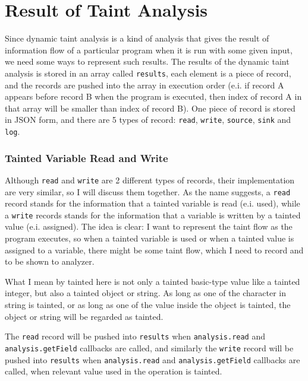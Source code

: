 \section{Result of Taint Analysis}

Since dynamic taint analysis is a kind of analysis that gives the result of information flow of a particular program when it is run with some given input, we need some ways to represent such results. The results of the dynamic taint analysis is stored in an array called \texttt{results}, each element is a piece of record, and the records are pushed into the array in execution order (e.i. if record A appears before record B when the program is executed, then index of record A in that array will be smaller than index of record B). One piece of record is stored in JSON form, and there are 5 types of record: \texttt{read}, \texttt{write}, \texttt{source}, \texttt{sink} and \texttt{log}.

\subsubsection{Tainted Variable Read and Write}

Although \texttt{read} and \texttt{write} are 2 different types of records, their implementation are very similar, so I will discuss them together. As the name suggests, a \texttt{read} record stands for the information that a tainted variable is read (e.i. used), while a \texttt{write} records stands for the information that a variable is written by a tainted value (e.i. assigned). The idea is clear: I want to represent the taint flow as the program executes, so when a tainted variable is used or when a tainted value is assigned to a variable, there might be some taint flow, which I need to record and to be shown to analyzer. 

What I mean by tainted here is not only a tainted basic-type value like a tainted integer, but also a tainted object or string. As long as one of the character in string is tainted, or as long as one of the value inside the object is tainted, the object or string will be regarded as tainted.

The \texttt{read} record will be pushed into \texttt{results} when \texttt{analysis.read} and \texttt{analysis.getField} callbacks are called, and similarly the \texttt{write} record will be pushed into \texttt{results} when \texttt{analysis.read} and \texttt{analysis.getField} callbacks are called, when relevant value used in the operation is tainted. 

